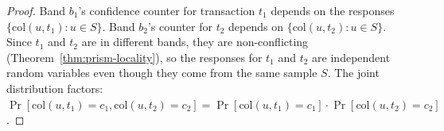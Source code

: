 \begin{proof}
Band $b_1$'s confidence counter for transaction $t_1$ depends on the responses
$\{\text{col}(u, t_1) : u \in S\}$. Band $b_2$'s counter for $t_2$ depends on
$\{\text{col}(u, t_2) : u \in S\}$. Since $t_1$ and $t_2$ are in different bands,
they are non-conflicting (Theorem~\ref{thm:prism-locality}), so the responses for $t_1$ and
$t_2$ are independent random variables even though they come from the same sample $S$.
The joint distribution factors: $\Pr[\text{col}(u, t_1) = c_1, \text{col}(u, t_2) = c_2] =
\Pr[\text{col}(u, t_1) = c_1] \cdot \Pr[\text{col}(u, t_2) = c_2]$.
\end{proof}

